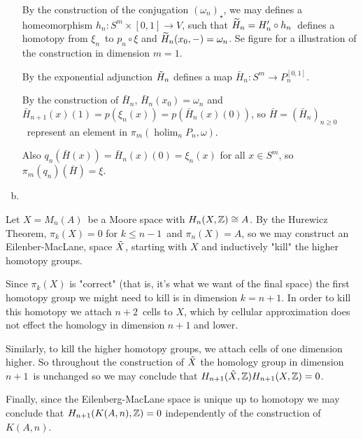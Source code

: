 \documentclass[a4paper,11pt,english]{article}
\DeclareMathOperator{\holim}{holim}
\begin{document}
\begin{exercise}[1]
\begin{enumerate}[(a)]
By the construction of the conjugation $(\omega_n)_\star$, we may defines a
homeomorphism $h_n : S^m \times [0,1] \to V$, such that $\widetilde H_n = H_n' \circ
h_n$ defines a homotopy from $\xi_n$ to $p_n \circ \xi$ and $\widetilde H_n(x_0,-) =
\omega_n$. Se figure  for a illustration of the construction in
dimension $m=1$.


By the exponential adjunction $\tilde H_n$ defines a map $\bar H_n: S^m \to
P_n^{[0,1]}$. 

By the construction of $\bar H_n$, $\bar H_n(x_0) = \omega_n$ and $\bar H_{n+1}
(x)(1) = p( \xi_{n}(x) ) = p (\bar H_n(x)(0))$, so $\bar H = (\bar H_n)_{n \ge
0}$ represent an element in $\pi_m(\holim_n P_n,\omega)$.

Also $q_n (\bar H(x)) = \bar H_n(x)(0) = \xi_n (x)$ for all $x\in S^m$, so
$\pi_m(q_n)(\bar H) = \xi$.


\item %

\end{enumerate}
\end{exercise}

\begin{exercise}[3]
Let $X = M_n(A)$ be a Moore space with $H_n(X,\mathbb{Z}) \cong A$. 
By the Hurewicz Theorem, $\pi_k(X) = 0$ for $k \le n-1$ and $\pi_n(X) = A$, so 
we may construct an Eilenber-MacLane, space $\tilde X$, starting with $X$ and
inductively "kill" the higher homotopy groups. 

Since $\pi_k(X)$ is "correct" (that is, it's what we want of the final space) 
the first homotopy group we might need to kill is in dimension $k=n+1$. 
In order to kill this homotopy we attach $n+2$ cells to $X$, which by cellular
approximation does not effect the homology in dimension $n+1$ and lower.

Similarly, to kill the higher homotopy groups, we attach cells of one dimension
higher. So throughout the construction of $\tilde X$ the homology group in dimension
$n+1$ is unchanged so we may conclude that $H_{n+1}(\tilde X, \mathbb{Z}) H_{n+1}(X, \mathbb{Z}) = 0$. 

Finally, since the Eilenberg-MacLane space is unique up to homotopy we may
conclude that $H_{n+1}(K(A,n),\mathbb{Z}) = 0$ independently of the construction of
$K(A,n)$.


\end{exercise}
\end{document}
